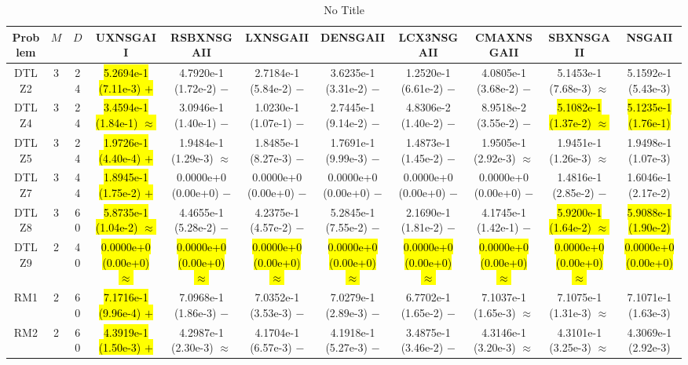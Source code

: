 \documentclass[journal]{IEEEtran}
\begin{document}
\begin{table*}[htbp]
\renewcommand{\arraystretch}{1.2}
\centering
\caption{No Title}
\begin{tabular}{ccccccccccc}
\toprule
Problem&$M$&$D$&UXNSGAII&RSBXNSGAII&LXNSGAII&DENSGAII&LCX3NSGAII&CMAXNSGAII&SBXNSGAII&NSGAII\\
\midrule
\multirow{1}{*}{DTLZ2}&3&24&\hl{5.2694e-1 (7.11e-3) $+$}&4.7920e-1 (1.72e-2) $-$&2.7184e-1 (5.84e-2) $-$&3.6235e-1 (3.31e-2) $-$&1.2520e-1 (6.61e-2) $-$&4.0805e-1 (3.68e-2) $-$&5.1453e-1 (7.68e-3) $\approx$&5.1592e-1 (5.43e-3)\\
\hline
\multirow{1}{*}{DTLZ4}&3&24&\hl{3.4594e-1 (1.84e-1) $\approx$}&3.0946e-1 (1.40e-1) $-$&1.0230e-1 (1.07e-1) $-$&2.7445e-1 (9.14e-2) $-$&4.8306e-2 (1.40e-2) $-$&8.9518e-2 (3.55e-2) $-$&\hl{5.1082e-1 (1.37e-2) $\approx$}&\hl{5.1235e-1 (1.76e-1)}\\
\hline
\multirow{1}{*}{DTLZ5}&3&24&\hl{1.9726e-1 (4.40e-4) $+$}&1.9484e-1 (1.29e-3) $\approx$&1.8485e-1 (8.27e-3) $-$&1.7691e-1 (9.99e-3) $-$&1.4873e-1 (1.45e-2) $-$&1.9505e-1 (2.92e-3) $\approx$&1.9451e-1 (1.26e-3) $\approx$&1.9498e-1 (1.07e-3)\\
\hline
\multirow{1}{*}{DTLZ7}&3&44&\hl{1.8945e-1 (1.75e-2) $+$}&0.0000e+0 (0.00e+0) $-$&0.0000e+0 (0.00e+0) $-$&0.0000e+0 (0.00e+0) $-$&0.0000e+0 (0.00e+0) $-$&0.0000e+0 (0.00e+0) $-$&1.4816e-1 (2.85e-2) $-$&1.6046e-1 (2.17e-2)\\
\hline
\multirow{1}{*}{DTLZ8}&3&60&\hl{5.8735e-1 (1.04e-2) $\approx$}&4.4655e-1 (5.28e-2) $-$&4.2375e-1 (4.57e-2) $-$&5.2845e-1 (7.55e-2) $-$&2.1690e-1 (1.81e-2) $-$&4.1745e-1 (1.42e-1) $-$&\hl{5.9200e-1 (1.64e-2) $\approx$}&\hl{5.9088e-1 (1.90e-2)}\\
\hline
\multirow{1}{*}{DTLZ9}&2&40&\hl{0.0000e+0 (0.00e+0) $\approx$}&\hl{0.0000e+0 (0.00e+0) $\approx$}&\hl{0.0000e+0 (0.00e+0) $\approx$}&\hl{0.0000e+0 (0.00e+0) $\approx$}&\hl{0.0000e+0 (0.00e+0) $\approx$}&\hl{0.0000e+0 (0.00e+0) $\approx$}&\hl{0.0000e+0 (0.00e+0) $\approx$}&\hl{0.0000e+0 (0.00e+0)}\\
\hline
\multirow{1}{*}{RM1}&2&60&\hl{7.1716e-1 (9.96e-4) $+$}&7.0968e-1 (1.86e-3) $-$&7.0352e-1 (3.53e-3) $-$&7.0279e-1 (2.89e-3) $-$&6.7702e-1 (1.65e-2) $-$&7.1037e-1 (1.65e-3) $\approx$&7.1075e-1 (1.31e-3) $\approx$&7.1071e-1 (1.63e-3)\\
\hline
\multirow{1}{*}{RM2}&2&60&\hl{4.3919e-1 (1.50e-3) $+$}&4.2987e-1 (2.30e-3) $\approx$&4.1704e-1 (6.57e-3) $-$&4.1918e-1 (5.27e-3) $-$&3.4875e-1 (3.46e-2) $-$&4.3146e-1 (3.20e-3) $\approx$&4.3101e-1 (3.25e-3) $\approx$&4.3069e-1 (2.92e-3)\\

\end{tabular}
\end{table*}
\end{document}
